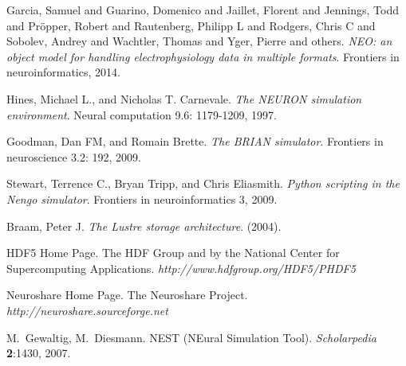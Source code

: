 \documentclass[]{YIC2015}
\begin{document}
\begin{thebibliography}{99}




Garcia, Samuel and Guarino, Domenico and Jaillet, Florent and Jennings, Todd and Pr{\"o}pper, Robert and Rautenberg, Philipp L and Rodgers, Chris C and Sobolev, Andrey and Wachtler, Thomas and Yger, Pierre and others.
\textit{NEO: an object model for handling electrophysiology data in multiple formats}.
Frontiers in neuroinformatics, 2014.

Hines, Michael L., and Nicholas T. Carnevale. \textit{The NEURON simulation environment}. Neural computation 9.6: 1179-1209, 1997.

Goodman, Dan FM, and Romain Brette. \textit{The BRIAN simulator}. Frontiers in neuroscience 3.2: 192, 2009.

Stewart, Terrence C., Bryan Tripp, and Chris Eliasmith. \textit{Python scripting in the Nengo simulator}. Frontiers in neuroinformatics 3, 2009.

Braam, Peter J. \textit{The Lustre storage architecture}. (2004).


HDF5 Home Page. The HDF Group and by the National Center for Supercomputing Applications. \textit{http://www.hdfgroup.org/HDF5/PHDF5}

Neuroshare Home Page. The Neuroshare Project. \textit{http://neuroshare.sourceforge.net}

M.~Gewaltig, M.~Diesmann. NEST (NEural Simulation Tool). \textit{Scholarpedia} %
\textbf{2}:1430, 2007.


\end{thebibliography}
\end{document}
